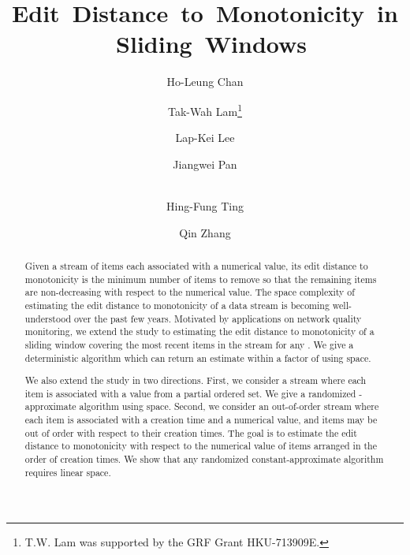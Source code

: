 \documentclass{llncs}
\begin{document}
\title{
  \mbox{Edit Distance to Monotonicity in Sliding Windows}
}


\author{Ho-Leung Chan
\and Tak-Wah Lam\thanks{T.W. Lam was supported by the GRF Grant HKU-713909E.}
\and Lap-Kei Lee
\and Jiangwei Pan
\and \\
Hing-Fung Ting
\and Qin Zhang
}




\vspace{-.3in}
\maketitle

\vspace{-.2in}
\begin{abstract}
Given a stream of items each associated with a numerical value,
its edit distance to monotonicity is the minimum number of items
to remove so that the remaining items are non-decreasing with respect
to the numerical value. The space complexity of estimating the
edit distance to monotonicity of a data stream is becoming well-understood
over the past few years.
Motivated by applications on network quality monitoring,
we extend the study to estimating the edit distance to monotonicity of
a sliding window covering the  most recent items in the stream for any .
We give a deterministic algorithm which can return an estimate within a factor of
 using  space.

We also extend the study in two directions.
First, we consider a stream where
each item is associated with a value from a partial ordered set.
We give a randomized -approximate algorithm
using  space.
Second, we consider an out-of-order stream where each item
is associated with a creation time and a numerical value,
and items may be out of order with respect to their creation times.
The goal is to estimate the edit distance to monotonicity
with respect to the numerical value of items
arranged in the order of creation times.
We show that any randomized constant-approximate algorithm
requires linear space.
\end{abstract}
\end{document}
